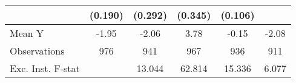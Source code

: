 {\begin{tabular}{l*{5}{c}}
            &     (0.190)         &     (0.292)         &     (0.345)         &     (0.106)         &                     \\
\midrule
Mean Y      &       -1.95         &       -2.06         &        3.78         &       -0.15         &       -2.08         \\
Observations&         976         &         941         &         967         &         936         &         911         \\
Exc. Inst. F-stat&                     &      13.044         &      62.814         &      15.336         &       6.077         \\
\bottomrule
\end{tabular}
}
